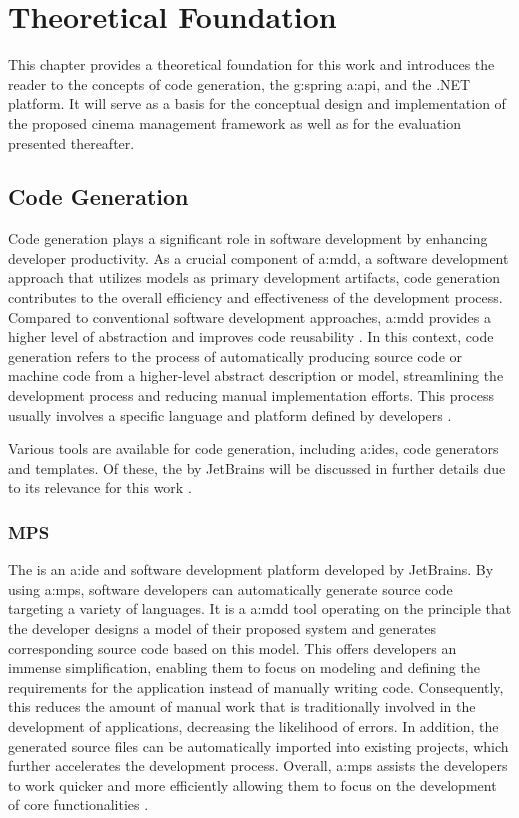\chapter{Theoretical Foundation}
\label{ch:foundation}

This chapter provides a theoretical foundation for this work and introduces the reader to the concepts of code generation, the \gls{g:spring} \gls{a:api}, and the .NET platform. It will serve as a basis for the conceptual design and implementation of the proposed cinema management framework as well as for the evaluation presented thereafter.

\section{Code Generation}

Code generation plays a significant role in software development by enhancing developer productivity. As a crucial component of \gls{a:mdd}, a software development approach that utilizes models as primary development artifacts, code generation contributes to the overall efficiency and effectiveness of the development process. Compared to conventional software development approaches, \gls{a:mdd} provides a higher level of abstraction and improves code reusability \cite{voelter2017model}. In this context, code generation refers to the process of automatically producing source code or machine code from a higher-level abstract description or model, streamlining the development process and reducing manual implementation efforts. This process usually involves a specific language and platform defined by developers \cite{greenfield2002code}.

Various tools are available for code generation, including \glspl{a:ide}, code generators and templates. Of these, the  by JetBrains will be discussed in further details due to its relevance for this work \cite{biermann2017model}.

\subsection{MPS}

The  is an \gls{a:ide} and software development platform developed by JetBrains. By using \gls{a:mps}, software developers can automatically generate source code targeting a variety of languages. It is a \gls{a:mdd} tool operating on the principle that the developer designs a model of their proposed system and generates corresponding source code based on this model. This offers developers an immense simplification, enabling them to focus on modeling and defining the requirements for the application instead of manually writing code. Consequently, this reduces the amount of manual work that is traditionally involved in the development of applications, decreasing the likelihood of errors. In addition, the generated source files can be automatically imported into existing projects, which further accelerates the development process. Overall, \gls{a:mps} assists the developers to work quicker and more efficiently allowing them to focus on the development of core functionalities \cite{voelter2013study}.

